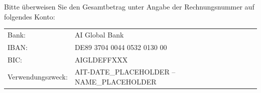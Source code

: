 \documentclass[a4paper,12pt]{article}
\begin{document}
\vspace{0.5cm}
\noindent
Bitte überweisen Sie den Gesamtbetrag unter Angabe der Rechnungsnummer auf folgendes Konto:

\vspace{0.3cm}
\begin{tabular}{ll}
Bank: & AI Global Bank \\
IBAN: & DE89 3704 0044 0532 0130 00 \\
BIC: & AIGLDEFFXXX \\
Verwendungszweck: & AIT-DATE_PLACEHOLDER – NAME_PLACEHOLDER
\end{tabular}

\end{document}
